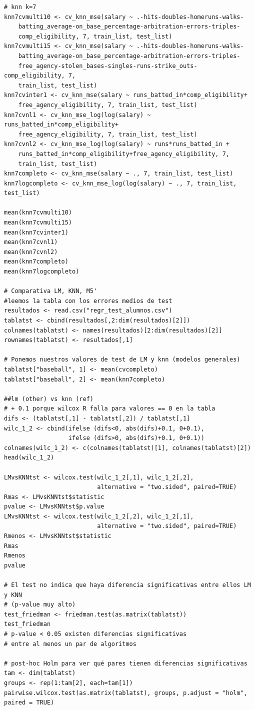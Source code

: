 \documentclass[a4paper,12pt, oneside]{book}
\begin{document}
\begin{verbatim}
# knn k=7
knn7cvmulti10 <- cv_knn_mse(salary ~ .-hits-doubles-homeruns-walks-
	batting_average-on_base_percentage-arbitration-errors-triples-
	comp_eligibility, 7, train_list, test_list)
knn7cvmulti15 <- cv_knn_mse(salary ~ .-hits-doubles-homeruns-walks-
	batting_average-on_base_percentage-arbitration-errors-triples-
	free_agency-stolen_bases-singles-runs-strike_outs-comp_eligibility, 7,
	train_list, test_list)
knn7cvinter1 <- cv_knn_mse(salary ~ runs_batted_in*comp_eligibility+
	free_agency_eligibility, 7, train_list, test_list)
knn7cvnl1 <- cv_knn_mse_log(log(salary) ~ runs_batted_in*comp_eligibility+
	free_agency_eligibility, 7, train_list, test_list)
knn7cvnl2 <- cv_knn_mse_log(log(salary) ~ runs*runs_batted_in + 
	runs_batted_in*comp_eligibility+free_agency_eligibility, 7,
	train_list, test_list)
knn7completo <- cv_knn_mse(salary ~ ., 7, train_list, test_list)
knn7logcompleto <- cv_knn_mse_log(log(salary) ~ ., 7, train_list, test_list)

mean(knn7cvmulti10)
mean(knn7cvmulti15)
mean(knn7cvinter1)
mean(knn7cvnl1)
mean(knn7cvnl2)
mean(knn7completo)
mean(knn7logcompleto)

# Comparativa LM, KNN, M5'
#leemos la tabla con los errores medios de test
resultados <- read.csv("regr_test_alumnos.csv")
tablatst <- cbind(resultados[,2:dim(resultados)[2]])
colnames(tablatst) <- names(resultados)[2:dim(resultados)[2]]
rownames(tablatst) <- resultados[,1]

# Ponemos nuestros valores de test de LM y knn (modelos generales)
tablatst["baseball", 1] <- mean(cvcompleto)
tablatst["baseball", 2] <- mean(knn7completo)

##lm (other) vs knn (ref)
# + 0.1 porque wilcox R falla para valores == 0 en la tabla
difs <- (tablatst[,1] - tablatst[,2]) / tablatst[,1]
wilc_1_2 <- cbind(ifelse (difs<0, abs(difs)+0.1, 0+0.1), 
	              ifelse (difs>0, abs(difs)+0.1, 0+0.1))
colnames(wilc_1_2) <- c(colnames(tablatst)[1], colnames(tablatst)[2])
head(wilc_1_2)

LMvsKNNtst <- wilcox.test(wilc_1_2[,1], wilc_1_2[,2], 
	                      alternative = "two.sided", paired=TRUE)
Rmas <- LMvsKNNtst$statistic
pvalue <- LMvsKNNtst$p.value
LMvsKNNtst <- wilcox.test(wilc_1_2[,2], wilc_1_2[,1], 
	                      alternative = "two.sided", paired=TRUE)
Rmenos <- LMvsKNNtst$statistic
Rmas
Rmenos
pvalue

# El test no indica que haya diferencia significativas entre ellos LM y KNN
# (p-value muy alto)
test_friedman <- friedman.test(as.matrix(tablatst))
test_friedman
# p-value < 0.05 existen diferencias significativas 
# entre al menos un par de algoritmos

# post-hoc Holm para ver qué pares tienen diferencias significativas
tam <- dim(tablatst)
groups <- rep(1:tam[2], each=tam[1])
pairwise.wilcox.test(as.matrix(tablatst), groups, p.adjust = "holm", paired = TRUE)
\end{verbatim}
\end{document}
